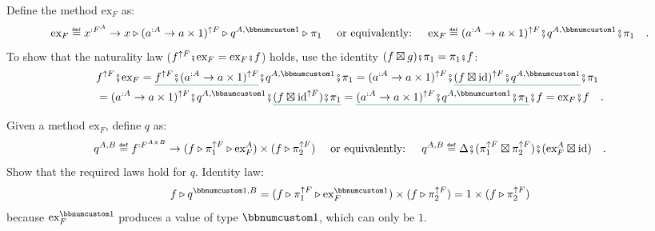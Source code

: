 Define the method $\text{ex}_{F}$ as:
\[
\text{ex}_{F}\triangleq x^{:F^{A}}\rightarrow x\triangleright(a^{:A}\rightarrow a\times1)^{\uparrow F}\triangleright q^{A,\bbnum 1}\triangleright\pi_{1}\quad\text{ or equivalently: }\quad\text{ex}_{F}\triangleq(a^{:A}\rightarrow a\times1)^{\uparrow F}\bef q^{A,\bbnum 1}\bef\pi_{1}\quad.
\]
To show that the naturality law ($f^{\uparrow F}\bef\text{ex}_{F}=\text{ex}_{F}\bef f$)
holds, use the identity $(f\boxtimes g)\bef\pi_{1}=\pi_{1}\bef f$:
\begin{align*}
 & f^{\uparrow F}\bef\text{ex}_{F}=\gunderline{f^{\uparrow F}\bef(a^{:A}\rightarrow a\times1)^{\uparrow F}}\bef q^{A,\bbnum 1}\bef\pi_{1}=(a^{:A}\rightarrow a\times1)^{\uparrow F}\bef\gunderline{(f\boxtimes\text{id})^{\uparrow F}\bef q^{A,\bbnum 1}}\bef\pi_{1}\\
 & =(a^{:A}\rightarrow a\times1)^{\uparrow F}\bef q^{A,\bbnum 1}\bef\gunderline{(f\boxtimes\text{id}^{\uparrow F})\bef\pi_{1}}=\gunderline{(a^{:A}\rightarrow a\times1)^{\uparrow F}\bef q^{A,\bbnum 1}\bef\pi_{1}}\bef f=\text{ex}_{F}\bef f\quad.
\end{align*}

Given a method $\text{ex}_{F}$, define $q$ as:
\[
q^{A,B}\triangleq f^{:F^{A\times B}}\rightarrow(f\triangleright\pi_{1}^{\uparrow F}\triangleright\text{ex}_{F}^{A})\times(f\triangleright\pi_{2}^{\uparrow F})\quad\text{ or equivalently: }\quad q^{A,B}\triangleq\Delta\bef(\pi_{1}^{\uparrow F}\boxtimes\pi_{2}^{\uparrow F})\bef(\text{ex}_{F}^{A}\boxtimes\text{id})\quad.
\]
Show that the required laws hold for $q$. Identity law: 
\[
f\triangleright q^{\bbnum 1,B}=(f\triangleright\pi_{1}^{\uparrow F}\triangleright\text{ex}_{F}^{\bbnum 1})\times(f\triangleright\pi_{2}^{\uparrow F})=1\times(f\triangleright\pi_{2}^{\uparrow F})
\]
because $\text{ex}_{F}^{\bbnum 1}$ produces a value of type $\bbnum 1$,
which can only be $1$.

